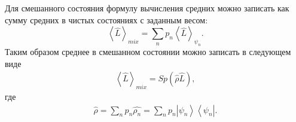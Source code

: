 Для смешанного состояния формулу вычисления средних можно записать
как сумму средних в чистых состояниях с заданным весом:
\[
\left< \hat{L} \right>_{mix} = \sum_n p_n \left< \hat{L}
\right>_{\psi_n}. 
\]
Таким образом среднее в смешанном состоянии можно записать в следующем
виде 
\begin{eqnarray}
\left< \hat{L} \right>_{mix} = Sp \left(\hat{\rho} \hat{L} \right),
\end{eqnarray}
где
\begin{eqnarray}
\hat{\rho} = \sum_n p_n \hat{\rho_n} = 
\sum_n p_n \left|\psi_n\right>\left<\psi_n\right|.
\end{eqnarray}



